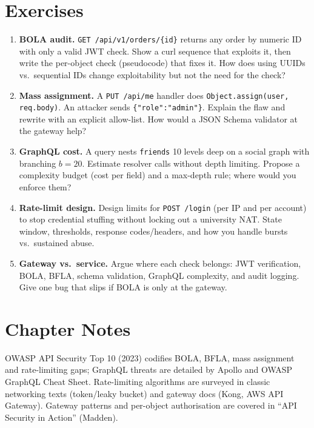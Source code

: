 \section{Exercises}
\label{sec:ch06-exercises}
\begin{enumerate}[label=E6.\arabic*, leftmargin=*, itemsep=0.6em]
    \item \textbf{BOLA audit.} \texttt{GET /api/v1/orders/\{id\}} returns any order by numeric ID with only a valid JWT check. Show a curl sequence that exploits it, then write the per-object check (pseudocode) that fixes it. How does using UUIDs vs.\ sequential IDs change exploitability but not the need for the check?
    \item \textbf{Mass assignment.} A \texttt{PUT /api/me} handler does \texttt{Object.assign(user, req.body)}. An attacker sends \texttt{\{"role":"admin"\}}. Explain the flaw and rewrite with an explicit allow-list. How would a JSON Schema validator at the gateway help?
    \item \textbf{GraphQL cost.} A query nests \texttt{friends} 10 levels deep on a social graph with branching $b=20$. Estimate resolver calls without depth limiting. Propose a complexity budget (cost per field) and a max-depth rule; where would you enforce them?
    \item \textbf{Rate-limit design.} Design limits for \texttt{POST /login} (per IP and per account) to stop credential stuffing without locking out a university NAT. State window, thresholds, response codes/headers, and how you handle bursts vs.\ sustained abuse.
    \item \textbf{Gateway vs.\ service.} Argue where each check belongs: JWT verification, BOLA, BFLA, schema validation, GraphQL complexity, and audit logging. Give one bug that slips if BOLA is only at the gateway.
\end{enumerate}

\section*{Chapter Notes}
OWASP API Security Top 10 (2023) codifies BOLA, BFLA, mass assignment and rate-limiting gaps; GraphQL threats are detailed by Apollo and OWASP GraphQL Cheat Sheet. Rate-limiting algorithms are surveyed in classic networking texts (token/leaky bucket) and gateway docs (Kong, AWS API Gateway). Gateway patterns and per-object authorisation are covered in ``API Security in Action'' (Madden).

